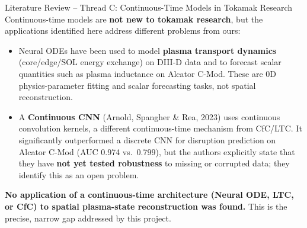 \documentclass[aspectratio=169]{beamer}
\begin{document}
\begin{frame}{Literature Review -- Thread C: Continuous-Time Models in Tokamak Research}
  \small
  Continuous-time models are \textbf{not new to tokamak research}, but the
  applications identified here address different problems from ours:
  \begin{itemize}
    \item Neural ODEs have been used to model \textbf{plasma transport
      dynamics} (core/edge/SOL energy exchange) on DIII-D data and to
      forecast scalar quantities such as plasma inductance on Alcator C-Mod.
      These are 0D physics-parameter fitting and scalar forecasting tasks,
      not spatial reconstruction.
    \item A \textbf{Continuous CNN} (Arnold, Spangher \& Rea, 2023) uses
      continuous convolution kernels, a different continuous-time mechanism
      from CfC/LTC. It significantly outperformed a discrete CNN for
      disruption prediction on Alcator C-Mod (AUC 0.974 vs.\ 0.799), but the
      authors explicitly state that they have \textbf{not yet tested
      robustness} to missing or corrupted data; they identify this as an open
      problem.
  \end{itemize}
  \vspace{6pt}
  \textbf{No application of a continuous-time architecture (Neural ODE, LTC,
  or CfC) to spatial plasma-state reconstruction was found.} This is the
  precise, narrow gap addressed by this project.
\end{frame}
\end{document}
